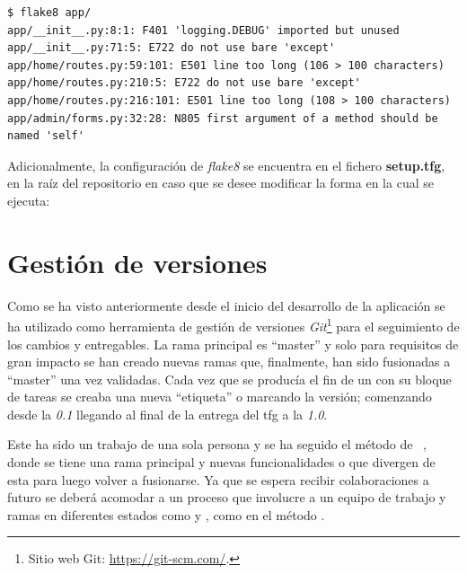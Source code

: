 \documentclass[11pt,spanish,listoffigures,listoftables]{tfgetsinf}
\begin{document}
\begin{lstlisting}[style=ascii-tree]
$ flake8 app/
app/__init__.py:8:1: F401 'logging.DEBUG' imported but unused
app/__init__.py:71:5: E722 do not use bare 'except'
app/home/routes.py:59:101: E501 line too long (106 > 100 characters)
app/home/routes.py:210:5: E722 do not use bare 'except'
app/home/routes.py:216:101: E501 line too long (108 > 100 characters)
app/admin/forms.py:32:28: N805 first argument of a method should be named 'self'
\end{lstlisting}

Adicionalmente, la configuración de \textit{flake8} se encuentra en el fichero \textbf{setup.tfg}, en la raíz del repositorio en caso que se desee modificar la forma en la cual se ejecuta: \newline

\begin{code}{setup.tfg}}
[flake8]
max-line-length=100
ignore=E402,E266
exclude=./migrations
\end{code}

\section{Gestión de versiones}

Como se ha visto anteriormente desde el inicio del desarrollo de la aplicación se ha utilizado como herramienta de gestión de versiones \textit{Git}\footnote{Sitio web Git: \url{https://git-scm.com/}.} para el seguimiento de los cambios y entregables. La rama principal es ``master'' y solo para requisitos de gran impacto se han creado nuevas ramas que, finalmente, han sido fusionadas a ``master'' una vez validadas. Cada vez que se producía el fin de un  con su bloque de tareas se creaba una nueva ``etiqueta'' o  marcando la versión; comenzando desde la \textit{0.1} llegando al final de la entrega del \acrshort{tfg} a la \textit{1.0}.

Este ha sido un trabajo de una sola persona y se ha seguido el método de ~\cite{link-git-flow}, donde se tiene una rama principal y nuevas funcionalidades o  que divergen de esta para luego volver a fusionarse. Ya que se espera recibir colaboraciones a futuro se deberá acomodar a un proceso que involucre a un equipo de trabajo y ramas en diferentes estados como  y , como en el método .
\end{document}
